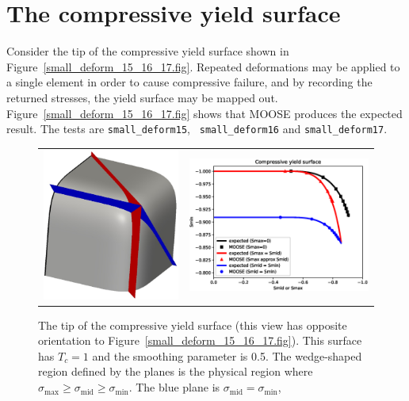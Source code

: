 \documentclass[]{scrreprt}
\newcommand{\smax}{\sigma_{\mathrm{max}}}
\newcommand{\smid}{\sigma_{\mathrm{mid}}}
\newcommand{\smin}{\sigma_{\mathrm{min}}}
\begin{document}
\section{The compressive yield surface}

Consider the tip of the compressive yield surface shown in
Figure~\ref{small_deform_15_16_17.fig}.  Repeated deformations may be
applied to a single element in order to cause compressive failure, and by
recording the returned stresses, the yield surface may be mapped out.
Figure~\ref{small_deform_15_16_17.fig} shows that MOOSE produces the
expected result.  The tests are {\tt small\_deform15}, {\tt
  small\_deform16} and {\tt small\_deform17}.

\begin{figure}[htb]
  \begin{center}
    \begin{tabular}{ll}
      \includegraphics[width=6cm]{compressive_with_planes.eps} &
      \includegraphics[width=8cm]{small_deform_15_16_17.eps}
    \end{tabular}
\caption{The tip of the compressive yield surface (this view has
  opposite orientation to Figure~\ref{small_deform_15_16_17.fig}).
  This surface has $T_{c}=1$ and the smoothing parameter is 0.5.  The
  wedge-shaped region defined by the planes is the physical region
  where $\smax\geq\smid\geq\smin$.  The blue plane is $\smid=\smin$,
}
\end{center}
\end{figure}
\end{document}
